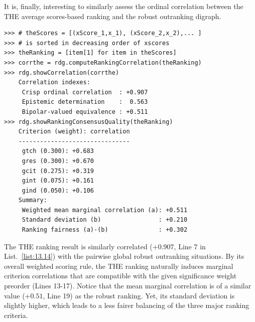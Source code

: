 It is, finally, interesting to similarly assess the ordinal correlation between the THE average scores-based ranking and the robust outranking digraph.
\begin{lstlisting}[caption={Computing the ordinal quality of the THE ranking},label=list:13.14]
>>> # theScores = [(xScore_1,x_1), (xScore_2,x_2),... ]
>>> # is sorted in decreasing order of xscores
>>> theRanking = [item[1] for item in theScores]
>>> corrthe = rdg.computeRankingCorrelation(theRanking)
>>> rdg.showCorrelation(corrthe)
    Correlation indexes:
     Crisp ordinal correlation  : +0.907
     Epistemic determination    :  0.563
     Bipolar-valued equivalence : +0.511
>>> rdg.showRankingConsensusQuality(theRanking)
    Criterion (weight): correlation
    -------------------------------
     gtch (0.300): +0.683
     gres (0.300): +0.670
     gcit (0.275): +0.319
     gint (0.075): +0.161
     gind (0.050): +0.106
    Summary:
     Weighted mean marginal correlation (a): +0.511
     Standard deviation (b)                : +0.210
     Ranking fairness (a)-(b)              : +0.302
\end{lstlisting}

The THE ranking result is similarly correlated ($+0.907$, Line 7 in List.~\ref{list:13.14}) with the pairwise global robust outranking situations. By its overall weighted scoring rule, the THE ranking naturally induces marginal criterion correlations that are compatible with the given significance weight preorder (Lines 13-17). Notice that the mean marginal correlation is of a similar value ($+0.51$, Line 19) as the robust \NetFlows ranking. Yet, its standard deviation is slightly higher, which leads to a less fairer balancing of the three major ranking criteria.

